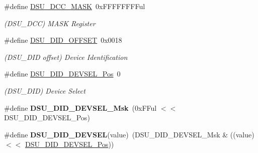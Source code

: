\begin{DoxyCompactItemize}
\item 
\hypertarget{group___s_a_m_l21___d_s_u_ga68f123ca6976eeb7b1320d0075b315d2}{}\#define \hyperlink{group___s_a_m_l21___d_s_u_ga68f123ca6976eeb7b1320d0075b315d2}{D\+S\+U\+\_\+\+D\+C\+C\+\_\+\+M\+A\+S\+K}~0x\+F\+F\+F\+F\+F\+F\+F\+Ful\label{group___s_a_m_l21___d_s_u_ga68f123ca6976eeb7b1320d0075b315d2}

\begin{DoxyCompactList}\small\item\em (D\+S\+U\+\_\+\+D\+C\+C) M\+A\+S\+K Register \end{DoxyCompactList}\item 
\hypertarget{group___s_a_m_l21___d_s_u_ga1f8a682ec241602def0bb6f06481e4ed}{}\#define \hyperlink{group___s_a_m_l21___d_s_u_ga1f8a682ec241602def0bb6f06481e4ed}{D\+S\+U\+\_\+\+D\+I\+D\+\_\+\+O\+F\+F\+S\+E\+T}~0x0018\label{group___s_a_m_l21___d_s_u_ga1f8a682ec241602def0bb6f06481e4ed}

\begin{DoxyCompactList}\small\item\em (D\+S\+U\+\_\+\+D\+I\+D offset) Device Identification \end{DoxyCompactList}\item 
\hypertarget{group___s_a_m_l21___d_s_u_gaf7877874825444352e8c546a2e1a2595}{}\#define \hyperlink{group___s_a_m_l21___d_s_u_gaf7877874825444352e8c546a2e1a2595}{D\+S\+U\+\_\+\+D\+I\+D\+\_\+\+D\+E\+V\+S\+E\+L\+\_\+\+Pos}~0\label{group___s_a_m_l21___d_s_u_gaf7877874825444352e8c546a2e1a2595}

\begin{DoxyCompactList}\small\item\em (D\+S\+U\+\_\+\+D\+I\+D) Device Select \end{DoxyCompactList}\item 
\hypertarget{group___s_a_m_l21___d_s_u_ga00a89f3dabb49fc218fa169f510affb1}{}\#define {\bfseries D\+S\+U\+\_\+\+D\+I\+D\+\_\+\+D\+E\+V\+S\+E\+L\+\_\+\+Msk}~(0x\+F\+Ful $<$$<$ D\+S\+U\+\_\+\+D\+I\+D\+\_\+\+D\+E\+V\+S\+E\+L\+\_\+\+Pos)\label{group___s_a_m_l21___d_s_u_ga00a89f3dabb49fc218fa169f510affb1}

\item 
\hypertarget{group___s_a_m_l21___d_s_u_gae7f77a8a06e459bf42b0bb130c1a1e58}{}\#define {\bfseries D\+S\+U\+\_\+\+D\+I\+D\+\_\+\+D\+E\+V\+S\+E\+L}(value)~(D\+S\+U\+\_\+\+D\+I\+D\+\_\+\+D\+E\+V\+S\+E\+L\+\_\+\+Msk \& ((value) $<$$<$ \hyperlink{group___s_a_m_l21___d_s_u_gaf7877874825444352e8c546a2e1a2595}{D\+S\+U\+\_\+\+D\+I\+D\+\_\+\+D\+E\+V\+S\+E\+L\+\_\+\+Pos}))\label{group___s_a_m_l21___d_s_u_gae7f77a8a06e459bf42b0bb130c1a1e58}


\end{DoxyCompactItemize}

